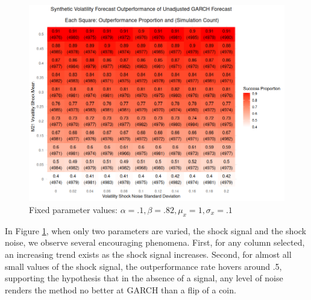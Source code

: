\documentclass[11pt]{article}
\theoremstyle{definition}
\begin{document}
\begin{figure}[ht!]
\begin{center}
  \includegraphics[scale=.45]{simulation_plots/standard_simulation_alpha_.1_beta_.82.png}
  \caption{Fixed parameter values: $\alpha = .1, \beta = .82, \mu_{x} = 1, \sigma_{x} = .1$}
  \label{fig:heavy_beta}
\end{center}
\end{figure}

In Figure \ref{fig:heavy_beta}, when only two parameters are varied, the shock signal and the shock noise, we observe several encouraging phenomena.  First, for any column selected, an increasing trend exists as the shock signal increases.  Second, for almost all small values of the shock signal, the outperformance rate hovers around .5, supporting the hypothesis that in the absence of a signal, any level of noise renders the method no better at GARCH than a flip of a coin.
\end{document}
